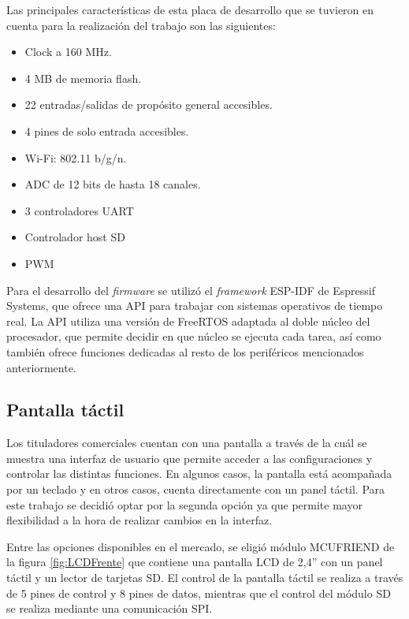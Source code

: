 Las principales características de esta placa de desarrollo que se tuvieron en cuenta para la realización del trabajo son las siguientes:
	\begin{itemize}
		\item Clock a 160 MHz.
		\item 4 MB de memoria flash.
		\item 22 entradas/salidas de propósito general accesibles.
		\item 4 pines de solo entrada accesibles. 
		\item Wi-Fi: 802.11 b/g/n.
		\item ADC de 12 bits de hasta 18 canales.
		\item 3 controladores UART
		\item Controlador host SD
		\item PWM
	\end{itemize}

Para el desarrollo del \textit{firmware} se utilizó el \textit{framework} ESP-IDF de Espressif Systems, que ofrece una API para trabajar con sistemas operativos de tiempo real. La API utiliza una versión de FreeRTOS adaptada al doble núcleo del procesador, 	que permite decidir en que núcleo se ejecuta cada tarea, así como también ofrece funciones dedicadas al resto de los periféricos mencionados anteriormente.

\vspace{1.5cm}

\subsection{Pantalla táctil}

Los tituladores comerciales cuentan con una pantalla a través de la cuál se muestra una interfaz de usuario que permite acceder a las configuraciones y controlar las distintas funciones. En algunos casos, la pantalla está acompañada por un teclado y en otros casos, cuenta directamente con un panel táctil. Para este trabajo se decidió optar por la segunda opción ya que permite mayor flexibilidad a la hora de realizar cambios en la interfaz.

Entre las opciones disponibles en el mercado, se eligió módulo MCUFRIEND de la figura \ref{fig:LCDFrente} que contiene una pantalla LCD de 2,4'' con un panel táctil y un lector de tarjetas SD. El control de la pantalla táctil se realiza a través de 5 pines de control y 8 pines de datos, mientras que el control del módulo SD se realiza mediante una comunicación SPI.


